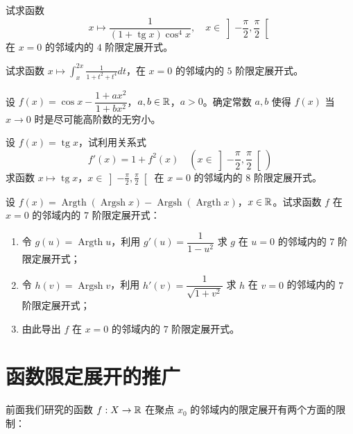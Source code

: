 \begin{exercise}
	\item 试求函数
	\[x\longmapsto\frac{1}{(1+\operatorname{tg}x)\cos^4x},\quad x\in\left]-\frac{\pi}{2},\frac{\pi}{2}\right[\]
	在 $x=0$ 的邻域内的 $4$ 阶限定展开式。
\end{exercise}

\begin{exercise}
	\item 试求函数 $x\longmapsto\displaystyle\int_{x}^{2x}\frac{1}{1+t^2+t^4}dt$，在 $x=0$ 的邻域内的 $5$ 阶限定展开式。
\end{exercise}

\begin{exercise}
	\item 设 $f(x)=\cos x-\dfrac{1+ax^2}{1+bx^2}$，$a,b\in\mathbb{R}$，$a>0$。确定常数 $a,b$ 使得 $f(x)$ 当 $x\to0$ 时是尽可能高阶数的无穷小。
\end{exercise}

\begin{exercise}
	\item 设 $f(x)=\operatorname{tg}x$，试利用关系式
	\[f'(x)=1+f^{2}(x)\quad\left(x\in\left]-\frac{\pi}{2},\frac{\pi}{2}\right[\right)\]
	求函数 $x\longmapsto\operatorname{tg}x$，$x\in\left]-\frac{\pi}{2},\frac{\pi}{2}\right[$ 在 $x=0$ 的邻域内的 $8$ 阶限定展开式。
\end{exercise}

\begin{exercise}
	\item 设 $f(x)=\operatorname{Argth}(\operatorname{Argsh}x)-\operatorname{Argsh}(\operatorname{Argth}x)$，$x\in\mathbb{R}$。试求函数 $f$ 在 $x=0$ 的邻域内的 $7$ 阶限定展开式：
	\begin{enumerate}[label=\arabic*)]
		\item 令 $g(u)=\operatorname{Argth}u$，利用 $g'(u)=\dfrac{1}{1-u^2}$ 求 $g$ 在 $u=0$ 的邻域内的 $7$ 阶限定展开式；
		\item 令 $h(v)=\operatorname{Argsh}v$，利用 $h'(v)=\dfrac{1}{\sqrt{1+v^2}}$ 求 $h$ 在 $v=0$ 的邻域内的 $7$ 阶限定展开式；
		\item 由此导出 $f$ 在 $x=0$ 的邻域内的 $7$ 阶限定展开式。
	\end{enumerate}
\end{exercise}

\section{函数限定展开的推广}

前面我们研究的函数 $f:X\to\mathbb{R}$ 在聚点 $x_0$ 的邻域内的限定展开有两个方面的限制：

